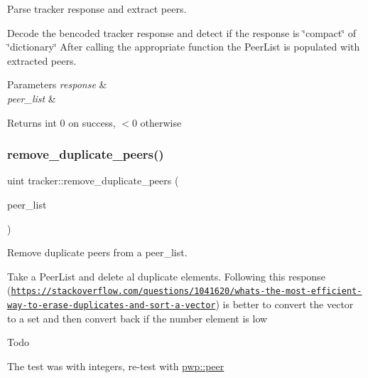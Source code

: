 Parse tracker response and extract peers. 

Decode the bencoded tracker response and detect if the response is \char`\"{}compact\char`\"{} of \char`\"{}dictionary\char`\"{} After calling the appropriate function the Peer\+List is populated with extracted peers.


\begin{DoxyParams}{Parameters}
{\em response} & \\
\hline
{\em peer\+\_\+list} & \\
\hline
\end{DoxyParams}
\begin{DoxyReturn}{Returns}
int 0 on success, $<$0 otherwise 
\end{DoxyReturn}
\mbox{\label{namespacetracker_ab1ce1ce0570dd4742e06b6941f63dbe4}} 
\subsubsection{\texorpdfstring{remove\+\_\+duplicate\+\_\+peers()}{remove\_duplicate\_peers()}}
{\footnotesize\ttfamily uint tracker\+::remove\+\_\+duplicate\+\_\+peers (\begin{DoxyParamCaption}\item[{\hyperlink{namespacepwp_ad07fa6df116b205302ad5ec172277184}{pwp\+::\+Peer\+List} \&}]{peer\+\_\+list }\end{DoxyParamCaption})}



Remove duplicate peers from a peer\+\_\+list. 

Take a Peer\+List and delete al duplicate elements. Following this response (\href{https://stackoverflow.com/questions/1041620/whats-the-most-efficient-way-to-erase-duplicates-and-sort-a-vector}{\tt https\+://stackoverflow.\+com/questions/1041620/whats-\/the-\/most-\/efficient-\/way-\/to-\/erase-\/duplicates-\/and-\/sort-\/a-\/vector}) is better to convert the vector to a set and then convert back if the number element is low \begin{DoxyRefDesc}{Todo}
\item[\hyperlink{todo__todo000002}{Todo}]The test was with integers, re-\/test with \hyperlink{structpwp_1_1peer}{pwp\+::peer}\end{DoxyRefDesc}


